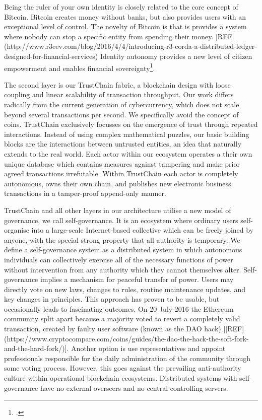\documentclass[USenglish]{article}
\begin{document}
Being the ruler of your own identity is closely related to the core concept of Bitcoin.
Bitcoin creates money without banks, but also provides users with an exceptional level of control.
The novelty of Bitcoin is that is provides a system where nobody can stop a specific entity from spending their money. [REF](http://www.r3cev.com/blog/2016/4/4/introducing-r3-corda-a-distributed-ledger-designed-for-financial-services)
Identity autonomy provides a new level of citizen empowerment and enables financial sovereignty\footcite{matouk2009financial}.

The second layer is our TrustChain fabric, a blockchain design with loose coupling and linear scalability of transaction throughput. 
Our work differs radically from the current generation of cybercurrency, which does not scale beyond several transactions per second. 
We specifically avoid the concept of coins.
TrustChain exclusively focusses on the emergence of trust through repeated interactions.
Instead of using complex mathematical puzzles, our basic building blocks are the interactions between untrusted entities, an idea that naturally extends to the real world.
Each actor within our ecosystem operates a their own unique database which contains measures against tampering and make prior agreed transactions irrefutable.
Within TrustChain each actor is completely autonomous, owns their own chain, and publishes new electronic business transactions in a tamper-proof append-only manner.

TrustChain and all other layers in our architecture utilise a new model of governance, we call self-governance.
It is an ecosystem where ordinary users self-organise into a large-scale Internet-based collective which can be freely joined by anyone, with the special strong property that all authority is temporary.
We define a self-governance system as a distributed system in which autonomous individuals can collectively exercise all of the necessary functions of power without intervention from any authority which they cannot themselves alter.
Self-governance implies a mechanism for peaceful transfer of power. 
Users may directly vote on new laws, changes to rules, routine maintenance updates, and key changes in principles. 
This approach has proven to be usable, but occasionally leads to fascinating outcomes.
On 20 July 2016 the Ethereum community split apart because a majority voted to revert a completely valid transaction, created by faulty user software (known as the DAO hack) [[REF](https://www.cryptocompare.com/coins/guides/the-dao-the-hack-the-soft-fork-and-the-hard-fork/)].
Another option is use representatives and appoint professionals responsible for the daily administration of the community through some voting process.
However, this goes against the prevailing anti-authority culture within operational blockchain ecosystems.
Distributed systems with self-governance have no external overseers and no central controlling servers.
\end{document}
